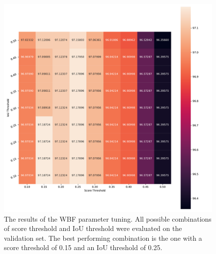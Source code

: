 \begin{figure}[H]
\begin{center}
    \includegraphics[width=\columnwidth]{imgs/yolo_wbf_heat.pdf}
    \caption{The results of the \ac{WBF} parameter tuning. All possible combinations of score threshold and \ac{IoU} threshold were evaluated on the validation set. The best performing combination is the one with a score threshold of 0.15 and an \ac{IoU} threshold of 0.25.}
    \label{fig:wbf_nms_tuning}
\end{center}
\end{figure}

